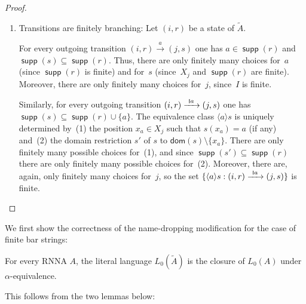 \documentclass[10pt,a4paper]{amsart}
\newcommand{\scriptmidmid}{\hspace{0.2ex}{\rule[-0.1ex]{0.6pt}{1.1ex}}\hspace{0.2ex}}
\newcommand{\compr}{:}
\newcommand{\scriptnew}[1]{{\scriptmidmid}#1}
\numberwithin{equation}{section}
\newcommand{\xto}[1]{\xrightarrow{~#1~}}
\newcommand{\seq}{\subseteq}
\newcommand{\tl}{\widetilde}
\newcommand{\dom}{\mathsf{dom}}
\newcommand{\braket}[1]{\langle #1 \rangle}
\newcommand{\+}[1]{\mathcal{#1}\xspace}
\DeclareMathOperator{\supp}{\mathsf{supp}} %
\theoremstyle{definition}
\begin{document}
\begin{proof}
\begin{enumerate}
  \item Transitions are finitely branching: Let $(i,r)$ be a state of
    $\tl{A}$.

    For every outgoing transition $(i,r)\xto{a}(j,s)$ one has
    $a\in \supp(r)$ and $\supp(s)\seq \supp(r)$. Thus, there are only
    finitely many choices for~$a$ (since $\supp(r)$ is finite) and
    for~$s$ (since~$X_j$ and $\supp(r)$ are finite). Moreover, there
    are only finitely many choices for~$j$, since~$I$ is finite.

    Similarly, for every outgoing transition $(i,r)\xto{\scriptnew a} (j,s)$ one
    has $\supp(s)\seq \supp(r)\cup \{a\}$. The equivalence class
    $\braket{a} s$ is uniquely determined by~(1) the position
    $x_a\in X_j$ such that $s(x_a)=a$ (if any) and~(2) the domain
    restriction $s'$ of $s$ to $\dom(s)\setminus \{x_a\}$. There are
    only finitely many possible choices for~(1), and since
    $\supp(s')\seq \supp(r)$ there are only finitely many possible
    choices for~(2). Moreover, there are, again, only finitely many
    choices for~$j$, so the set
    $\{ \braket{a} s \compr (i,r)\xto{\scriptnew a}(j,s) \}$ is finite.\qedhere
  \end{enumerate}
\end{proof}

We first show the correctness of the name-dropping modification for the case of finite bar strings:

\begin{theorem}\label{thm:ncd_rnna}
  For every RNNA $A$, the literal language $L_0(\tl{A})$ is the closure of $L_0(A)$
  under $\alpha$-equivalence.
\end{theorem}
This follows from the two lemmas below:
\end{document}
